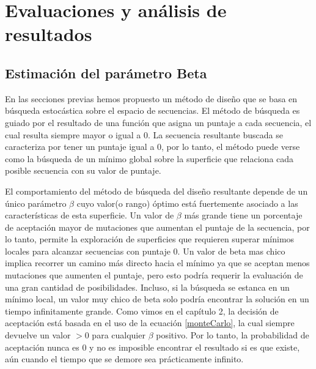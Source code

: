 \chapter{Evaluaciones y análisis de resultados}
\label{results}

\section{Estimación del parámetro Beta}

En las secciones previas hemos propuesto un método de diseño que se basa en búsqueda estocástica sobre el espacio de secuencias.
El método de búsqueda es guiado por el resultado de una función que asigna un puntaje a cada secuencia, el cual resulta siempre mayor o igual a 0.
La secuencia resultante buscada se caracteriza por tener un puntaje igual a 0, por lo tanto, el método puede verse como la búsqueda de un mínimo global sobre la superficie
que relaciona cada posible secuencia con su valor de puntaje.

El comportamiento del método de búsqueda del diseño resultante depende de un único parámetro $\beta$ cuyo valor(o rango) óptimo está fuertemente asociado a las características de esta superficie.
Un valor de $\beta$ más grande tiene un porcentaje de aceptación mayor de mutaciones que aumentan el puntaje de la secuencia, por lo tanto, permite la exploración de superficies que 
requieren superar mínimos locales para alcanzar secuencias con puntaje 0.
Un valor de beta mas chico implica recorrer un camino más directo hacia el mínimo ya que se aceptan menos mutaciones que aumenten el puntaje, pero esto podría requerir la evaluación de una gran cantidad de posibilidades. 
Incluso, si la búsqueda se estanca en un mínimo local, un valor muy chico de beta solo podría encontrar la solución en un tiempo infinitamente 
grande. Como vimos en el capítulo 2, la decisión de aceptación está basada en el uso de la ecuación \ref{monteCarlo}, la cual siempre devuelve un valor $>0$ para cualquier $\beta$ positivo.
Por lo tanto, la probabilidad de aceptación nunca es 0 y no es imposible encontrar el resultado si es que existe, aún cuando el tiempo que se demore sea prácticamente infinito.

